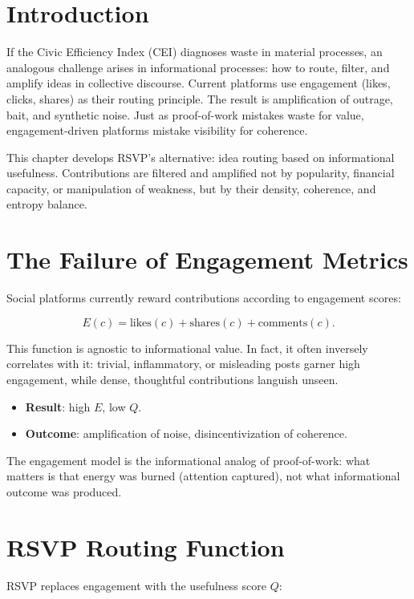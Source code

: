 \documentclass[openany]{book}
\begin{document}
\section{Introduction}

If the Civic Efficiency Index (CEI) diagnoses waste in material processes, an analogous challenge arises in informational processes: how to route, filter, and amplify ideas in collective discourse. Current platforms use engagement (likes, clicks, shares) as their routing principle. The result is amplification of outrage, bait, and synthetic noise. Just as proof-of-work mistakes waste for value, engagement-driven platforms mistake visibility for coherence.

This chapter develops RSVP’s alternative: idea routing based on informational usefulness. Contributions are filtered and amplified not by popularity, financial capacity, or manipulation of weakness, but by their density, coherence, and entropy balance.

\section{The Failure of Engagement Metrics}

Social platforms currently reward contributions according to engagement scores:

\[ E(c) = \text{likes}(c) + \text{shares}(c) + \text{comments}(c). \]

This function is agnostic to informational value. In fact, it often inversely correlates with it: trivial, inflammatory, or misleading posts garner high engagement, while dense, thoughtful contributions languish unseen.

\begin{itemize}
    \item \textbf{Result}: high $E$, low $Q$.
    \item \textbf{Outcome}: amplification of noise, disincentivization of coherence.
\end{itemize}

The engagement model is the informational analog of proof-of-work: what matters is that energy was burned (attention captured), not what informational outcome was produced.

\section{RSVP Routing Function}

RSVP replaces engagement with the usefulness score $Q$:
\end{document}
